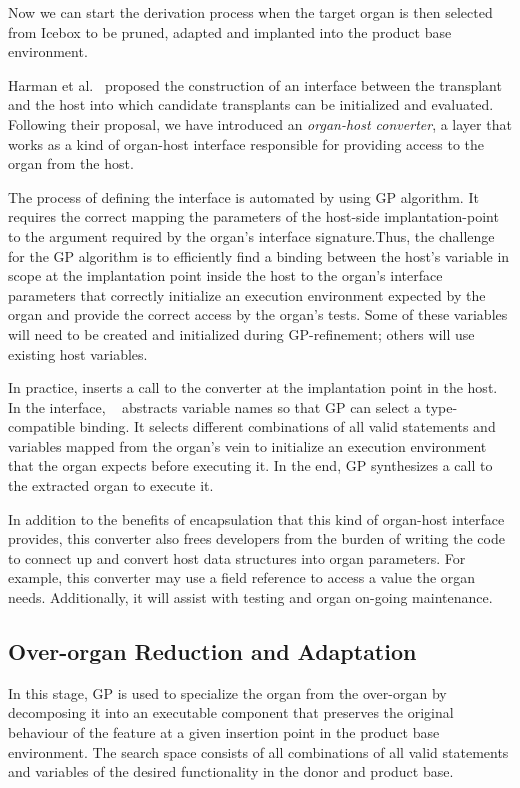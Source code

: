 Now we can start the derivation process when the target organ is then selected from Icebox to be pruned, adapted and implanted into the product base environment.

Harman et al.~\cite{Harman2013} proposed the construction of an interface between the transplant and the host into which candidate transplants can be initialized and evaluated. Following their proposal, we have introduced an \emph{organ-host converter}, a layer that works as a kind of organ-host interface responsible for providing access to the organ from the host.

The process of defining the interface is automated by using GP algorithm. It requires the correct mapping the parameters of the host-side implantation-point to the argument required by the organ's interface signature.Thus, the challenge for the GP algorithm is to efficiently find a binding between the host’s variable in scope at the implantation point inside the host to the organ’s interface parameters that correctly initialize an execution environment expected by the organ and provide the correct access by the organ’s tests. Some of these variables will need to be created and initialized during GP-refinement; others will use existing host variables. 

In practice, \autoscalpel inserts a call to the converter at the implantation point in the host. In the interface, \autoscalpel~ abstracts variable names so that GP can select a type-compatible binding. It selects different combinations of all valid statements and variables mapped from the organ's vein to initialize an execution environment that the organ expects before executing it. In the end, GP synthesizes a call to the extracted organ to execute it.

In addition to the benefits of encapsulation that this kind of organ-host interface provides, this converter also frees developers from the burden of writing the code to connect up and convert host data structures into organ parameters. For example, this converter may use a field reference to access a value the organ needs. Additionally, it will assist with testing and organ on-going maintenance.

\subsection{Over-organ Reduction and Adaptation}\label{sec:organ_reduction}

In this stage, GP is used to specialize the organ from the over-organ by decomposing it into an executable component that preserves the original behaviour of the feature at a given insertion point in the product base environment. The search space consists of all combinations of all valid statements and variables of the desired functionality in the donor and product base. 

